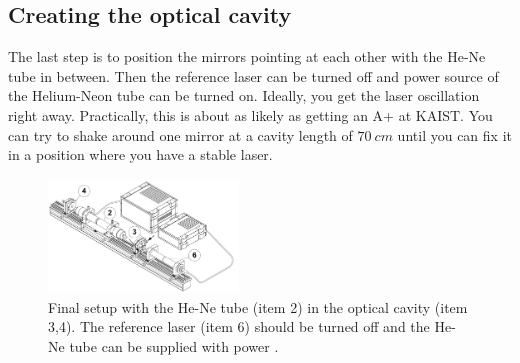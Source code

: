 \subsection{Creating the optical cavity}
\label{sec:Creating the optical cavity}
The last step is to position the mirrors pointing at each other with the He-Ne tube in between. Then
the reference laser can be turned off and power source of the Helium-Neon tube can be turned on.
Ideally, you get the laser oscillation right away. Practically, this is about as likely as getting an
A+ at KAIST. You can try to
shake around one mirror at a cavity length of $\SI{70}{cm}$ until you can fix it in a position where
you have a stable laser.

\begin{figure}
  \centering
  \includegraphics[width=0.45\textwidth]{media/setup.png}
  \caption{Final setup with the He-Ne tube (item 2) in the optical cavity (item 3,4). The reference laser (item 6)
  should be turned off and the He-Ne tube can be supplied with power \cite{elas_manual}.}
  \label{fig:setup}
\end{figure}
